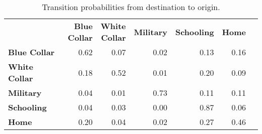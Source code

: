 \begin{ThreePartTable}

	\begin{longtable}[c]{@{}lrrrrrr@{}}
		\caption{Transition probabilities from destination to origin.}
		\label{tab:TransitionProbabilitiesDestinationToOrigin}

		\setlength\extrarowheight{2.5pt}
		
		\\
		\toprule
   & \thead{\textbf{Blue} \\ \textbf{Collar}}    & \thead{\textbf{White} \\ \textbf{Collar}}  & \textbf{Military} & \textbf{Schooling} & \textbf{Home}   \\ \midrule
		\endfirsthead
		
\textbf{Blue	 Collar }&	0.62	&	0.07	&	0.02	&	0.13	&	0.16	\\
\textbf{White Collar	}&	0.18	&	0.52	&	0.01	&	0.20	&	0.09	\\
\textbf{Military}	&	0.04	&	0.01	&	0.73	&	0.11	&	0.11	\\
\textbf{Schooling}	&	0.04	&	0.03	&	0.00	&	0.87	&	0.06	\\
\textbf{Home}	&	0.20	&	0.04	&	0.02	&	0.27	&	0.46	\\
  \bottomrule
	\end{longtable}
\end{ThreePartTable}